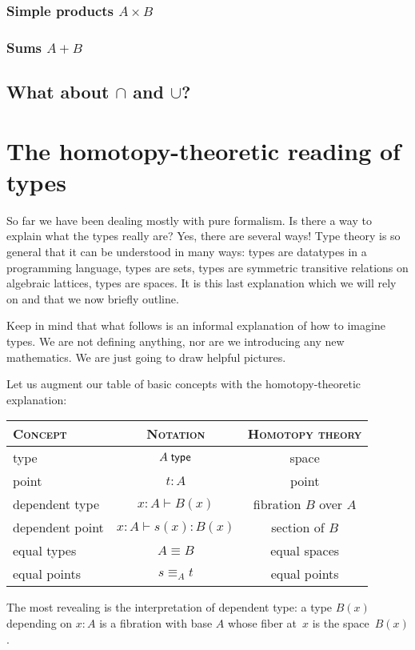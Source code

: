 \documentclass{article}
\begin{document}
\subsubsection{Simple products $A \times B$}

\subsubsection{Sums $A + B$}

\subsection{What about $\cap$ and $\cup$?}


\section{The homotopy-theoretic reading of types}

So far we have been dealing mostly with pure formalism. Is there a way to
explain what the types really are? Yes, there are several ways! Type theory is
so general that it can be understood in many ways: types are datatypes in a
programming language, types are sets, types are symmetric transitive relations
on algebraic lattices, types are spaces. It is this last explanation which we
will rely on and that we now briefly outline.

Keep in mind that what follows is an informal explanation of how to imagine
types. We are not defining anything, nor are we introducing any new mathematics.
We are just going to draw helpful pictures.

Let us augment our table of basic concepts with the homotopy-theoretic explanation:
%
\begin{center}
\begin{tabular}{lcc}
  \toprule
  \textsc{Concept} & \textsc{Notation} & \textsc{Homotopy theory} \\
  \midrule
  type             & $A\; \mathsf{type}$ & space \\
  point            & $t : A$ & point \\
  dependent type   & $x : A \vdash B(x)$ & fibration $B$ over $A$\\
  dependent point  & $x : A \vdash s(x) : B(x)$ & section of $B$ \\
  equal types      & $A \equiv B$ & equal spaces \\
  equal points     & $s \equiv_A t$ & equal points  \\
  \bottomrule
\end{tabular}
\end{center}
%
The most revealing is the interpretation of dependent type: a type $B(x)$
depending on $x : A$ is a fibration with base $A$ whose fiber at~$x$ is the
space~$B(x)$.
\end{document}
